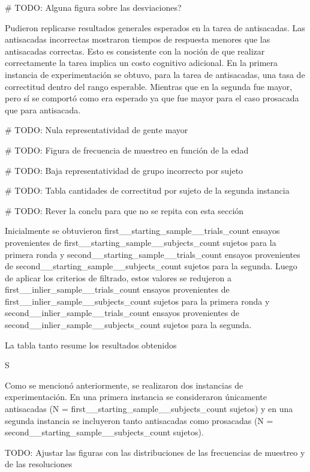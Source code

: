 # TODO: Alguna figura sobre las desviaciones?


Pudieron replicarse resultados generales esperados en la tarea de antisacadas.
Las antisacadas incorrectas mostraron tiempos de respuesta menores que las
antisacadas correctas.
Esto es consistente con la noción de que realizar correctamente la tarea
implica un costo cognitivo adicional.
En la primera instancia de experimentación se obtuvo, para la tarea de
antisacadas, una tasa de correctitud dentro del rango esperable.
Mientras que en la segunda fue mayor, pero sí se comportó como era esperado ya
que fue mayor para el caso prosacada que para antisacada.

# TODO: Nula representatividad de gente mayor

# TODO: Figura de frecuencia de muestreo en función de la edad


# TODO: Baja representatividad de grupo incorrecto por sujeto

# TODO: Tabla cantidades de correctitud por sujeto de la segunda instancia

%

# TODO: Rever la conclu para que no se repita con esta sección


Inicialmente se obtuvieron {first__starting_sample__trials_count} ensayos
provenientes de {first__starting_sample__subjects_count} sujetos para la
primera ronda y {second__starting_sample__trials_count} ensayos provenientes de
{second__starting_sample__subjects_count} sujetos para la segunda.
Luego de aplicar los criterios de filtrado, estos valores se redujeron a
{first__inlier_sample__trials_count} ensayos provenientes de
{first__inlier_sample__subjects_count} sujetos para la primera ronda y
{second__inlier_sample__trials_count} ensayos provenientes de
{second__inlier_sample__subjects_count} sujetos para la segunda.


La tabla tanto resume los resultados obtenidos

S

Como se mencionó anteriormente, se realizaron dos instancias de experimentación.
En una primera instancia se consideraron únicamente antisacadas (N =
{first__starting_sample__subjects_count} sujetos) y en una segunda
instancia se incluyeron tanto antisacadas como prosacadas (N =
{second__starting_sample__subjects_count} sujetos).

TODO: Ajustar las figuras con las distribuciones de las frecuencias de muestreo
      y de las resoluciones

